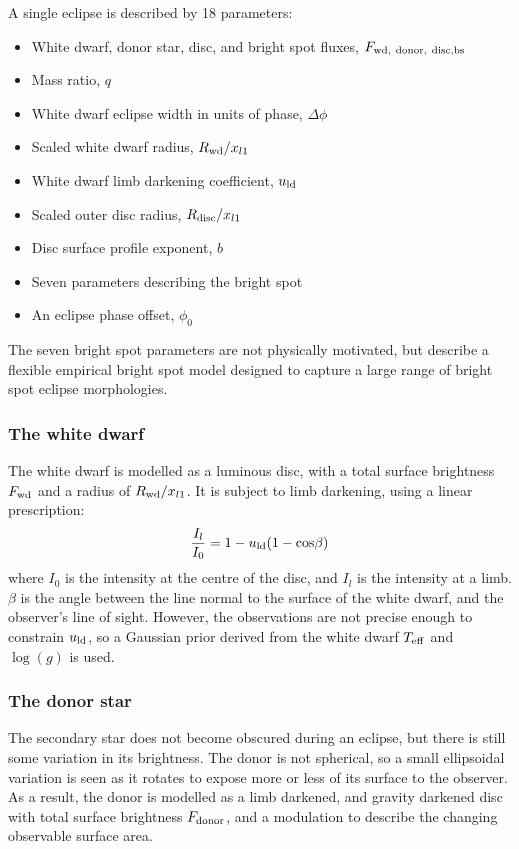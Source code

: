 A single eclipse is described by 18 parameters:
\begin{itemize}
    \setlength\itemsep{0em}
    \item White dwarf, donor star, disc, and bright spot fluxes, $F_{\rm wd,\ donor,\ disc, bs}$
    \item Mass ratio, $q$
    \item White dwarf eclipse width in units of phase, $\Delta \phi$
    \item Scaled white dwarf radius, $R_{\rm wd} / x_{l1}$
    \item White dwarf limb darkening coefficient, $u_{\rm ld}$
    \item Scaled outer disc radius, $R_{\rm disc} / x_{l1}$
    \item Disc surface profile exponent, $b$
    \item Seven parameters describing the bright spot
    \item An eclipse phase offset, $\phi_0$
\end{itemize}
The seven bright spot parameters are not physically motivated, but describe a flexible empirical bright spot model designed to capture a large range of bright spot eclipse morphologies.

\subsubsection{The white dwarf}

The white dwarf is modelled as a luminous disc, with a total surface brightness $F_{\rm wd}$ and a radius of $R_{\rm wd} / x_{l1}$. It is subject to limb darkening, using a linear prescription:
\begin{equation}
    \frac{I_l}{I_0} = 1 - u_{\rm ld}(1 - {\rm cos}\beta)
\end{equation}
where $I_0$ is the intensity at the centre of the disc, and $I_l$ is the intensity at a limb. $\beta$ is the angle between the line normal to the surface of the white dwarf, and the observer's line of sight.
However, the observations are not precise enough to constrain $u_{\rm ld}$, so a Gaussian prior derived from the white dwarf $T_{\rm eff}$ and $\log(g)$ is used.

\subsubsection{The donor star}

The secondary star does not become obscured during an eclipse, but there is still some variation in its brightness. The donor is not spherical, so a small ellipsoidal variation is seen as it rotates to expose more or less of its surface to the observer. As a result, the donor is modelled as a limb darkened, and gravity darkened disc with total surface brightness $F_{\rm donor}$, and a modulation to describe the changing observable surface area.

